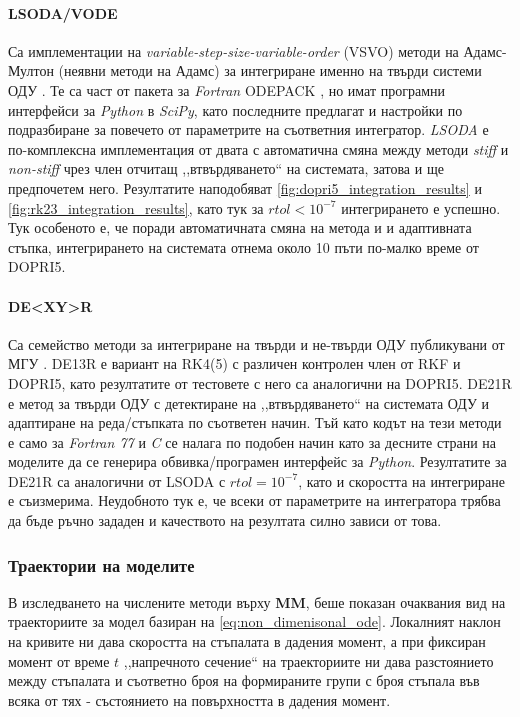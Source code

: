 \paragraph{LSODA/VODE} Са имплементации на \textit{variable-step-size-variable-order} (VSVO) методи на Адамс-Мултон (неявни методи на Адамс) за интегриране именно на твърди системи ОДУ \cite{Shampine2002}. Те са част от пакета за \textit{Fortran} ODEPACK \cite{odepack1992}, но имат програмни интерфейси за \textit{Python} в \textit{SciPy}, като последните предлагат и настройки по подразбиране за повечето от параметрите на съответния интегратор. \textit{LSODA} е по-комплексна имплементация от двата с автоматична смяна между методи \textit{stiff} и \textit{non-stiff} чрез член отчитащ ,,втвърдяването`` на системата, затова и ще предпочетем него. Резултатите наподобяват \autoref{fig:dopri5_integration_results} и \autoref{fig:rk23_integration_results}, като тук за $rtol < 10^{-7}$ интегрирането е успешно. Тук особеното е, че поради автоматичната смяна на метода и и адаптивната стъпка, интегрирането на системата отнема около 10 пъти по-малко време от DOPRI5. 

\paragraph{DE<XY>R} Са семейство методи за интегриране на твърди и не-твърди ОДУ публикувани от МГУ \cite{DEXYRD}. DE13R е вариант на RK4(5) с различен контролен член от RKF и DOPRI5, като резултатите от тестовете с него са аналогични на DOPRI5. DE21R е метод за твърди ОДУ с детектиране на ,,втвърдяването`` на системата ОДУ и адаптиране на реда/стъпката по съответен начин. Тъй като кодът на тези методи е само за \textit{Fortran 77} и \textit{C} се налага по подобен начин като за десните страни на моделите да се генерира обвивка/програмен интерфейс за \textit{Python}. Резултатите за DE21R са аналогични от LSODA с $rtol = 10^{-7}$, като и скоростта на интегриране е съизмерима. Неудобното тук е, че всеки от параметрите на интегратора трябва да бъде ръчно зададен и качеството на резултата силно зависи от това.

\subsubsection{Траектории на моделите}
В изследването на числените методи върху \textbf{MM}, беше показан очаквания вид на траекториите за модел базиран на \autoref{eq:non_dimenisonal_ode}. Локалният наклон на кривите ни дава скоростта на стъпалата в дадения момент, а при фиксиран момент от време $t$ ,,напречното сечение`` на траекториите ни дава разстоянието между стъпалата и съответно броя на формираните групи с броя стъпала във всяка от тях - състоянието на повърхността в дадения момент.

